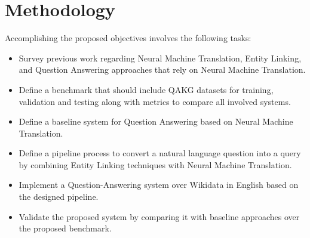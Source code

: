 \section{Methodology}
Accomplishing the proposed objectives involves the following tasks:
\begin{itemize}
    \item Survey previous work regarding Neural Machine Translation, Entity Linking, and 
    Question Answering approaches that rely on Neural Machine Translation.
    \item Define a benchmark that should include QAKG datasets for training, validation and 
    testing along with metrics to compare all involved systems.
    \item Define a baseline system for Question Answering based on Neural Machine Translation.
    \item Define a pipeline process to convert a natural language question into a \SPARQL{} query 
    by combining Entity Linking techniques with Neural Machine Translation.
    \item Implement a Question-Answering system over Wikidata in English based on the designed pipeline.
    \item Validate the proposed system by comparing it with baseline approaches over the 
    proposed benchmark.
\end{itemize}
